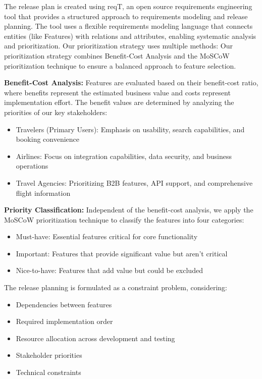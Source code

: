 The release plan is created using reqT, an open source requirements engineering tool that provides a structured approach to requirements modeling and release planning. The tool uses a flexible requirements modeling language that connects entities (like Features) with relations and attributes, enabling systematic analysis and prioritization. Our prioritization strategy uses multiple methods:
Our prioritization strategy combines Benefit-Cost Analysis and the MoSCoW prioritization technique to ensure a balanced approach to feature selection.

\textbf{Benefit-Cost Analysis:} Features are evaluated based on their benefit-cost ratio, where benefits represent the estimated business value and costs represent implementation effort. The benefit values are determined by analyzing the priorities of our key stakeholders:
\begin{itemize}
\item Travelers (Primary Users): Emphasis on usability, search capabilities, and booking convenience
\item Airlines: Focus on integration capabilities, data security, and business operations
\item Travel Agencies: Prioritizing B2B features, API support, and comprehensive flight information
\end{itemize}

\textbf{Priority Classification:} Independent of the benefit-cost analysis, we apply the MoSCoW prioritization technique to classify the features into four categories:
\begin{itemize}
\item Must-have: Essential features critical for core functionality
\item Important: Features that provide significant value but aren't critical
\item Nice-to-have: Features that add value but could be excluded
\end{itemize}

The release planning is formulated as a constraint problem, considering:
\begin{itemize}
\item Dependencies between features
\item Required implementation order
\item Resource allocation across development and testing
\item Stakeholder priorities
\item Technical constraints
\end{itemize}

